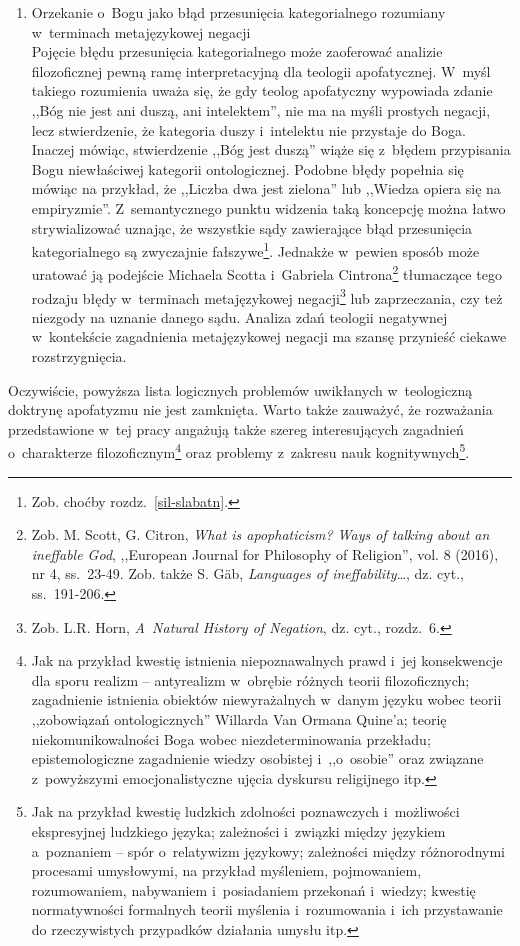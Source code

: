 \begin{enumerate}[label = \arabic*), itemindent=6mm, labelwidth=4mm, labelsep=2mm, itemsep=1em, leftmargin=0mm]
\item Orzekanie o~Bogu jako błąd przesunięcia kategorialnego rozumiany w~terminach metajęzykowej negacji\\
Pojęcie błędu przesunięcia kategorialnego może zaoferować analizie filozoficznej pewną ramę interpretacyjną dla teologii apofatycznej. W~myśl takiego rozumienia uważa się, że gdy teolog apofatyczny wypowiada zdanie ,,Bóg nie jest ani duszą, ani intelektem'', nie ma na myśli prostych negacji, lecz stwierdzenie, że kategoria duszy i~intelektu nie przystaje do Boga. Inaczej mówiąc, stwierdzenie ,,Bóg jest duszą'' wiąże się z~błędem przypisania Bogu niewłaściwej kategorii ontologicznej. Podobne błędy popełnia się mówiąc na przykład, że ,,Liczba dwa jest zielona'' lub ,,Wiedza opiera się na empiryzmie''. Z~semantycznego punktu widzenia taką koncepcję można łatwo strywializować uznając, że wszystkie sądy zawierające błąd przesunięcia kategorialnego są zwyczajnie fałszywe\footnote{Zob. choćby rozdz.~\ref{sil-slabatn}.}. Jednakże w~pewien sposób może uratować ją podejście Michaela Scotta i~Gabriela Cintrona\footnote{Zob. M. Scott, G. Citron, \textit{What is apophaticism? Ways of talking about an ineffable God}, ,,European Journal for Philosophy of Religion'', vol. 8 (2016), nr 4, ss.~23-49. Zob. także S. Gäb, \textit{Languages of ineffability}…, dz. cyt., ss.~191-206.} tłumaczące tego rodzaju błędy w~terminach metajęzykowej negacji\footnote{Zob. L.R. Horn, \textit{A~Natural History of Negation}, dz. cyt., rozdz.~6.} lub zaprzeczania, czy też niezgody na uznanie danego sądu. Analiza zdań teologii negatywnej w~kontekście zagadnienia metajęzykowej negacji ma szansę przynieść ciekawe rozstrzygnięcia.
\end{enumerate}

Oczywiście, powyższa lista logicznych problemów uwikłanych w~teologiczną doktrynę apofatyzmu nie jest zamknięta. Warto także zauważyć, że rozważania przedstawione w~tej pracy angażują także szereg interesujących zagadnień o~charakterze filozoficznym\footnote{Jak na przykład kwestię istnienia niepoznawalnych prawd i~jej konsekwencje dla sporu realizm -- antyrealizm w~obrębie różnych teorii filozoficznych; zagadnienie istnienia obiektów niewyrażalnych w~danym języku wobec teorii ,,zobowiązań ontologicznych'' Willarda Van Ormana Quine'a; teorię niekomunikowalności Boga wobec niezdeterminowania przekładu; epistemologiczne zagadnienie wiedzy osobistej i~,,o~osobie'' oraz związane z~powyższymi emocjonalistyczne ujęcia dyskursu religijnego itp.} oraz problemy z~zakresu nauk kognitywnych\footnote{Jak na przykład kwestię ludzkich zdolności poznawczych i~możliwości ekspresyjnej ludzkiego języka; zależności i~związki między językiem a~poznaniem -- spór o~relatywizm językowy; zależności między różnorodnymi procesami umysłowymi, na przykład myśleniem, pojmowaniem, rozumowaniem, nabywaniem i~posiadaniem przekonań i~wiedzy; kwestię normatywności formalnych teorii myślenia i~rozumowania i~ich przystawanie do rzeczywistych przypadków działania umysłu itp.}.

